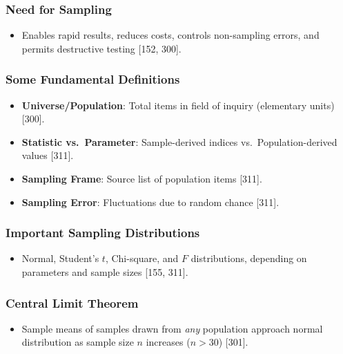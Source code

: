 \documentclass[
]{article}
\providecommand{\tightlist}{%
  \setlength{\itemsep}{0pt}\setlength{\parskip}{0pt}}
\begin{document}
\subsubsection{Need for Sampling}\label{need-for-sampling}

\begin{itemize}
\tightlist
\item
  Enables rapid results, reduces costs, controls non-sampling errors,
  and permits destructive testing {[}152, 300{]}.
\end{itemize}

\subsubsection{Some Fundamental
Definitions}\label{some-fundamental-definitions}

\begin{itemize}
\tightlist
\item
  \textbf{Universe/Population}: Total items in field of inquiry
  (elementary units) {[}300{]}.
\item
  \textbf{Statistic vs.~Parameter}: Sample-derived indices
  vs.~Population-derived values {[}311{]}.
\item
  \textbf{Sampling Frame}: Source list of population items {[}311{]}.
\item
  \textbf{Sampling Error}: Fluctuations due to random chance {[}311{]}.
\end{itemize}

\subsubsection{Important Sampling
Distributions}\label{important-sampling-distributions}

\begin{itemize}
\tightlist
\item
  Normal, Student's \(t\), Chi-square, and \(F\) distributions,
  depending on parameters and sample sizes {[}155, 311{]}.
\end{itemize}

\subsubsection{Central Limit Theorem}\label{central-limit-theorem}

\begin{itemize}
\tightlist
\item
  Sample means of samples drawn from \emph{any} population approach
  normal distribution as sample size \(n\) increases (\(n > 30\))
  {[}301{]}.
\end{itemize}
\end{document}
